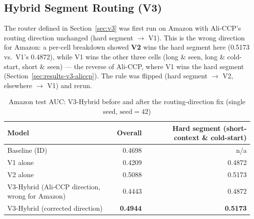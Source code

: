 \documentclass{uclthesis}
\begin{document}
\subsection{Hybrid Segment Routing (V3)}
\label{sec:results-v3-amazon}

The router defined in Section~\ref{sec:v3} was first run on Amazon with Ali-CCP's routing direction unchanged (hard segment $\to$ V1). This is the wrong direction for Amazon: a per-cell breakdown showed \textbf{V2} wins the hard segment here (0.5173 vs.\ V1's 0.4872), while V1 wins the other three cells (long \& seen, long \& cold-start, short \& seen) --- the reverse of Ali-CCP, where V1 wins the hard segment (Section~\ref{sec:results-v3-aliccp}). The rule was flipped (hard segment $\to$ V2, elsewhere $\to$ V1) and rerun.

\begin{table}[h]
\centering
\caption{Amazon test AUC: V3-Hybrid before and after the routing-direction fix (single seed, $\text{seed}=42$)}
\label{tab:v3-results-amazon}
\begin{tabular}{lrr}
\toprule
Model & Overall & Hard segment (short-context \& cold-start) \\
\midrule
Baseline (ID)                       & 0.4698 & n/a \\
V1 alone                            & 0.4209 & 0.4872 \\
V2 alone                            & 0.5088 & 0.5173 \\
V3-Hybrid (Ali-CCP direction, wrong for Amazon) & 0.4443 & 0.4872 \\
V3-Hybrid (corrected direction)     & \textbf{0.4944} & \textbf{0.5173} \\
\bottomrule
\end{tabular}
\end{table}
\end{document}
